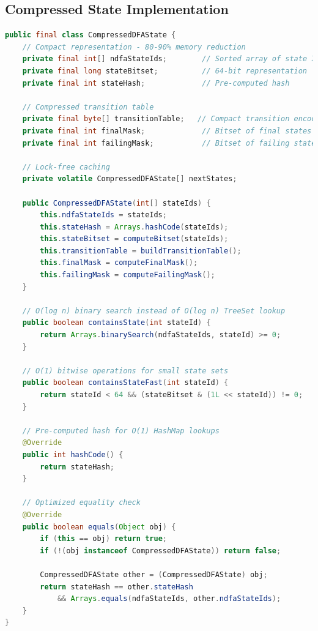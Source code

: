 \documentclass[11pt,a4paper]{article}
\begin{document}
\subsection{Compressed State Implementation}

\begin{lstlisting}[language=Java,caption={Proposed CompressedDFAState Implementation}]
public final class CompressedDFAState {
    // Compact representation - 80-90% memory reduction
    private final int[] ndfaStateIds;        // Sorted array of state IDs
    private final long stateBitset;          // 64-bit representation
    private final int stateHash;             // Pre-computed hash
    
    // Compressed transition table
    private final byte[] transitionTable;   // Compact transition encoding
    private final int finalMask;             // Bitset of final states
    private final int failingMask;           // Bitset of failing states
    
    // Lock-free caching
    private volatile CompressedDFAState[] nextStates;
    
    public CompressedDFAState(int[] stateIds) {
        this.ndfaStateIds = stateIds;
        this.stateHash = Arrays.hashCode(stateIds);
        this.stateBitset = computeBitset(stateIds);
        this.transitionTable = buildTransitionTable();
        this.finalMask = computeFinalMask();
        this.failingMask = computeFailingMask();
    }
    
    // O(log n) binary search instead of O(log n) TreeSet lookup
    public boolean containsState(int stateId) {
        return Arrays.binarySearch(ndfaStateIds, stateId) >= 0;
    }
    
    // O(1) bitwise operations for small state sets
    public boolean containsStateFast(int stateId) {
        return stateId < 64 && (stateBitset & (1L << stateId)) != 0;
    }
    
    // Pre-computed hash for O(1) HashMap lookups
    @Override
    public int hashCode() {
        return stateHash;
    }
    
    // Optimized equality check
    @Override
    public boolean equals(Object obj) {
        if (this == obj) return true;
        if (!(obj instanceof CompressedDFAState)) return false;
        
        CompressedDFAState other = (CompressedDFAState) obj;
        return stateHash == other.stateHash 
            && Arrays.equals(ndfaStateIds, other.ndfaStateIds);
    }
}
\end{lstlisting}
\end{document}
